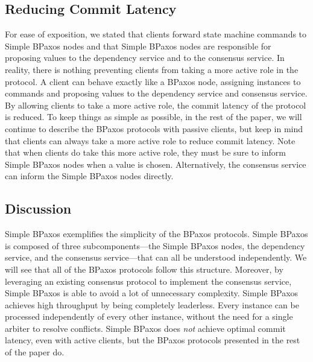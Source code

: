 \subsection{Reducing Commit Latency}
For ease of exposition, we stated that clients forward state machine commands
to Simple BPaxos nodes and that Simple BPaxos nodes are responsible for
proposing values to the dependency service and to the consensus service. In
reality, there is nothing preventing clients from taking a more active role in
the protocol. A client can behave exactly like a BPaxos node, assigning
instances to commands and proposing values to the dependency service and
consensus service.
%
By allowing clients to take a more active role, the commit latency of the
protocol is reduced. To keep things as simple as possible, in the rest of the
paper, we will continue to describe the BPaxos protocols with passive clients,
but keep in mind that clients can always take a more active role to reduce
commit latency.
%
Note that when clients do take this more active role, they must be sure to
inform Simple BPaxos nodes when a value is chosen. Alternatively, the
consensus service can inform the Simple BPaxos nodes directly.

\subsection{Discussion}
Simple BPaxos exemplifies the simplicity of the BPaxos protocols. Simple BPaxos
is composed of three subcomponents---the Simple BPaxos nodes, the dependency
service, and the consensus service---that can all be understood independently.
We will see that all of the BPaxos protocols follow this structure.
%
Moreover, by leveraging an existing consensus protocol to implement the
consensus service, Simple BPaxos is able to avoid a lot of unnecessary
complexity.
%
Simple BPaxos achieves high throughput by being completely leaderless. Every
instance can be processed independently of every other instance, without the
need for a single arbiter to resolve conflicts.
%
Simple BPaxos does \emph{not} achieve optimal commit latency, even with active
clients, but the BPaxos protocols presented in the rest of the paper do.
